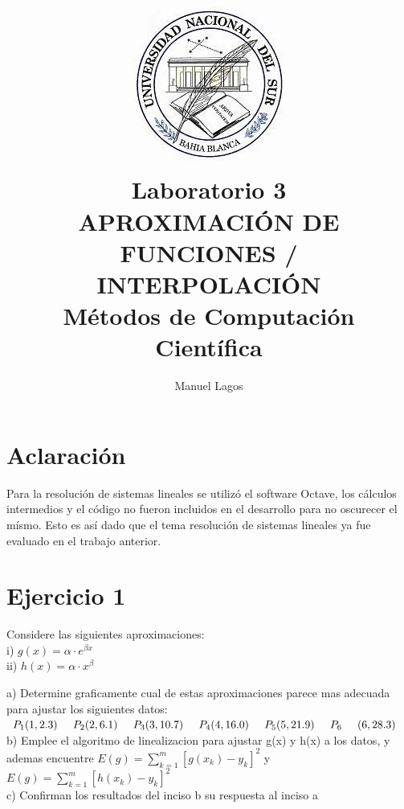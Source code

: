 \documentclass{article}
\title{\includegraphics[scale=0.5]{logo.jpg}\\ \textbf{Laboratorio 3} 
\\ \large APROXIMACIÓN DE FUNCIONES / INTERPOLACIÓN           
\\ \large Métodos de Computación Científica}
\author{Manuel Lagos}
\begin{document}
\setcounter{section}{-1}
\maketitle

\section{Aclaración}
Para la resolución de sistemas lineales se utilizó el software Octave, los cálculos intermedios y el código no fueron incluidos en el desarrollo para no oscurecer el mísmo. Esto es así dado que el tema resolución de sistemas lineales ya fue evaluado en el trabajo anterior.

\section{Ejercicio 1}
 Considere las siguientes aproximaciones:\\
i) $g(x) = \alpha \cdot e^{\beta x}$\\
ii) $h(x) = \alpha \cdot x^{\beta}$

a) Determine graficamente cual de estas aproximaciones parece mas adecuada para ajustar los
siguientes datos:\\
\hspace{0.5cm} $P_1 (1, 2.3) \hspace{0.5cm} P_2 (2, 6.1) \hspace{0.5cm} P_3(3, 10.7) \hspace{0.5cm} P_4 (4, 16.0) \hspace{0.5cm} P_5 (5, 21.9) \hspace{0.5cm} P_6 \hspace{0.5cm} (6, 28.3)$\\
b) Emplee el algoritmo de linealizacion para ajustar g(x) y h(x) a los datos, y ademas encuentre
$E(g) = \sum_{k=1}^m{[g(x_k)-y_k]^2}$ y $E(g) = \sum_{k=1}^m{[h(x_k)-y_k]^2}$\\
c) Confirman los resultados del inciso b su respuesta al inciso a\\ \\ \\ \\ \\ \\ \\ \\ \\ \\ \\ \\ \\ \\ \\ \\
\end{document}
